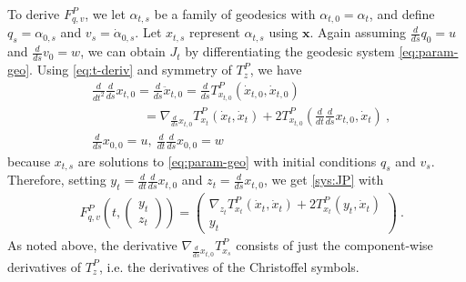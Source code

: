 \documentclass[final]{svjour3}
\newcommand{\df}[2]{\tfrac{d}{d#2} #1}
\newcommand{\sdf}[2]{\scriptscriptstyle\frac{d}{d#2} #1}
\newcommand{\param}[1]{\mathbf{#1}}
\begin{document}
    To derive $F_{q,v}^P$, we let $\alpha_{t,s}$ be a family of geodesics with
    $\alpha_{t,0}=\alpha_t$, and define
    $q_s=\alpha_{0,s}$ and $v_s=\dot{\alpha}_{0,s}$. Let $x_{t,s}$ represent
    $\alpha_{t,s}$ using $\param{x}$.
    Again assuming $\df{q_0}{s}=u$ and $\df{v_0}{s}=w$,
    we can obtain $J_t$ by differentiating the 
    geodesic system \eqref{eq:param-geo}. Using \eqref{eq:t-deriv} and symmetry of
    $T_z^P$, we have
    \begin{equation}
        \begin{split}
            &\df{\df{x_{t,0}}{s}}{t^2}
            =
            \df{\ddot{x}_{t,0}}{s}
            =
            \df{T_{x_{t,0}}^P(\dot{x}_{t,0},\dot{x}_{t,0}}{s})
            \\
            &\qquad\qquad
            =
            \nabla_{\sdf{x_{t,0}}{s}}T_{x_t}^P(\dot{x}_t,\dot{x}_t)
            +2T_{x_{t,0}}^P(\df{\df{x_{t,0}}{s}}{t},\dot{x}_t)\ ,\\
            &\df{x_{0,0}}{s}=u,\ \df{\df{x_{0,0}}{s}}{t}=w
        \end{split}
    \end{equation}
    because $x_{t,s}$ are solutions to \eqref{eq:param-geo} with initial conditions
    $q_s$ and $v_s$. Therefore, setting 
    $y_t=\df{\df{x_{t,0}}{s}}{t}$
    and 
    $z_t=\df{x_{t,0}}{s}$,
    we get \eqref{sys:JP} with
    \begin{align*}
        &F_{q,v}^P(t,
            \begin{pmatrix}
                y_t\\
                z_t
            \end{pmatrix}
        )
        =
        \begin{pmatrix}
            \nabla_{z_t}T_{x_t}^P(\dot{x}_t,\dot{x}_t)
            +2T_{x_t}^P(y_t,\dot{x}_t)
            \\
            y_t
        \end{pmatrix}
        \ .
    \end{align*}
    As noted above, the derivative $\nabla_{\sdf{x_{t,0}}{s}}T_{x_s}^P$ consists of 
    just the component-wise
    derivatives of $T_z^P$, i.e. the derivatives of the Christoffel symbols.
\end{document}
